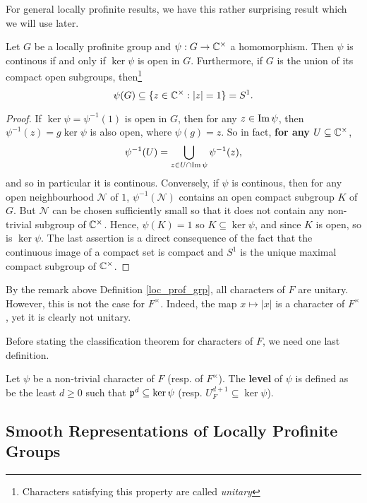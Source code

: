 For general locally profinite results, we have this rather surprising result which we will use later. 
\begin{lemma}\label{lem_cont_chars}
    Let $G$ be a locally profinite group and $\psi: G\rightarrow\mathbb{C}^{\times}$ a homomorphism. Then $\psi$ is continous if and only if $\ker\psi$ is open in $G$. Furthermore, if $G$ is the union of its compact open subgroups, then\footnote{Characters satisfying this property are called \textit{unitary}} $$\psi(G)\subseteq\{z\in\mathbb{C}^{\times}:|z|=1\}=S^1.$$
\end{lemma}
\begin{proof}
    If $\ker\psi=\psi^{-1}(1)$ is open in $G$, then for any $z\in\operatorname{Im}\psi$, then $\psi^{-1}(z)=g\ker\psi$ is also open, where $\psi(g)=z$. So in fact, \textbf{for any} $U\subseteq\mathbb{C}^{\times}$, 
    $$\psi^{-1}(U)=\bigcup_{z\in U\cap\operatorname{Im}\psi}\psi^{-1}(z),$$
    and so in particular it is continous.
    Conversely, if $\psi$ is continous, then for any open neighbourhood $\mathcal{N}$ of $1$, $\psi^{-1}(\mathcal{N})$ contains an open compact subgroup $K$ of $G$. But $\mathcal{N}$ can be chosen sufficiently small so that it does not contain any non-trivial subgroup of $\mathbb{C}^{\times}$. Hence, $\psi(K)=1$ so $K\subseteq\ker\psi$, and since $K$ is open, so is $\ker\psi$.
    The last assertion is a direct consequence of the fact that the continuous image of a compact set is compact and $S^1$ is the unique maximal compact subgroup of $\mathbb{C}^{\times}$.
\end{proof}

By the remark above Definition \ref{loc_prof_grp}, all characters of $F$ are unitary. However, this is not the case for $F^{\times}$. Indeed, the map $x\mapsto|x|$ is a character of $F^{\times}$, yet it is clearly not unitary. 

Before stating the classification theorem for   characters of $F$, we need one last definition. 

\begin{defn}
    Let $\psi$ be a non-trivial character of $F$ (resp. of $F^{\times}$). The \textbf{level} of $\psi$ is defined as be the least $d\geq0$ such that $\mathfrak{p}^d\subseteq\ker\psi$ (resp. $U_F^{d+1}\subseteq\ker\psi$).
\end{defn}




\subsection{Smooth Representations of Locally Profinite Groups}

